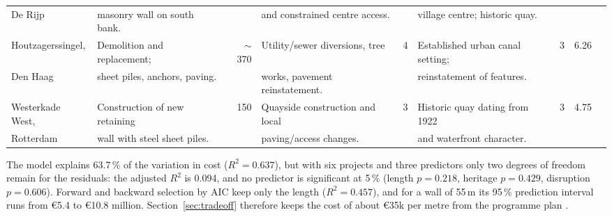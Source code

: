 \begin{table}[htbp]
\begin{tabular}{@{} l l r l c l c r l @{}}
De Rijp & masonry wall on south bank. & & and constrained centre access. & & village centre; historic quay. & & & \cite{tuingrachtTender} \\
\addlinespace
Houtzagerssingel, & Demolition and replacement; & $\sim$370 & Utility/sewer diversions, tree & 4 & Established urban canal setting; & 3 & 6.26 & \cite{houtzagersTender,} \\
Den Haag & sheet piles, anchors, paving. & & works, pavement reinstatement. & & reinstatement of features. & & & \cite{houtzagersContractor} \\
\addlinespace
Westerkade West, & Construction of new retaining & 150 & Quayside construction and local & 3 & Historic quay dating from 1922 & 3 & 4.75 & \cite{westerkadeTender,} \\
Rotterdam & wall with steel sheet piles. & & paving/access changes. & & and waterfront character. & & & \cite{westerkadeContractor} \\
\bottomrule
\end{tabular}
\end{table}

The model explains 63.7\,\% of the variation in cost ($R^2 = 0.637$), but with
six projects and three predictors only two degrees of freedom remain for the
residuals: the adjusted $R^2$ is 0.094, and no predictor is significant at
5\,\% (length $p = 0.218$, heritage $p = 0.429$, disruption $p = 0.606$).
Forward and backward selection by AIC keep only the length ($R^2 = 0.457$), and
for a wall of 55\,m its 95\,\% prediction interval runs from \textminus\euro5.4
to \euro10.8 million. Section~\ref{sec:tradeoff} therefore keeps the cost of
about \euro35k per metre from the programme plan
\parencite{utrecht_programmaplan}.
